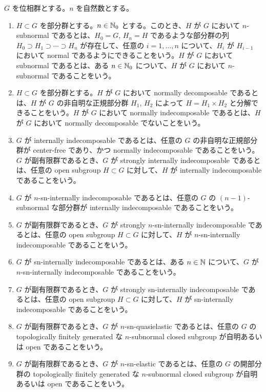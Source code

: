 \begin{defn}\label{0003}
  $G$ を位相群とする。$n$ を自然数とする。
  \begin{enumerate}
    \item $H \subset G$ を部分群とする。$n \in \mathbb{N}_0$ とする。このとき、$H$ が $G$ において $n$-subnormal であるとは、$H_0 = G$, $H_n = H$ であるような部分群の列 $H_0 \supset H_1 \supset \cdots \supset H_n$ が存在して、任意の $i = 1, \ldots, n$ について、$H_i$ が $H_{i - 1}$ において normal であるようにできることをいう。$H$ が $G$ において subnormal であるとは、ある $n \in \mathbb{N}_0$ について、$H$ が $G$ において $n$-subnormal であることをいう。
    \item $H \subset G$ を部分群とする。$H$ が $G$ において normally decomposable であるとは、$H$ が $G$ の非自明な正規部分群 $H_1$, $H_2$ によって $H = H_1 \times H_2$ と分解できることをいう。$H$ が $G$ において normally indecomposable であるとは、$H$ が $G$ において normally decomposable でないことをいう。
    \item $G$ が internally indecomposable であるとは、任意の $G$ の非自明な正規部分群が center-free であり、かつ normally indecomposable であることをいう。$G$ が副有限群であるとき、$G$ が strongly internally indecomposable であるとは、任意の open subgroup $H \subset G$ に対して、$H$ が internally indecomposable であることをいう。
    \item $G$ が $n$-sn-internally indecomposable であるとは、任意の $G$ の $(n - 1)$-subnormal な部分群が internally indecomposable であることをいう。
    \item $G$ が副有限群であるとき、$G$ が strongly $n$-sn-internally indecomposable であるとは、任意の open subgroup $H \subset G$ に対して、$H$ が $n$-sn-internally indecomposable であることをいう。
    \item $G$ が sn-internally indecomposable であるとは、ある $n \in \mathbb{N}$ について、$G$ が $n$-sn-internally indecomposable であることをいう。
    \item $G$ が副有限群であるとき、$G$ が strongly sn-internally indecomposable であるとは、任意の open subgroup $H \subset G$ に対して、$H$ が sn-internally indecomposable であることをいう。
    \item $G$ が副有限群であるとき、$G$ が $n$-sn-quasielastic であるとは、任意の $G$ の topologically finitely generated な $n$-subnormal closed subgroup が自明あるいは open であることをいう。
    \item $G$ が副有限群であるとき、$G$ が $n$-sn-elastic であるとは、任意の $G$ の開部分群の topologically finitely generated な $n$-subnormal closed subgroup が自明あるいは open であることをいう。

\end{enumerate}
\end{defn}
